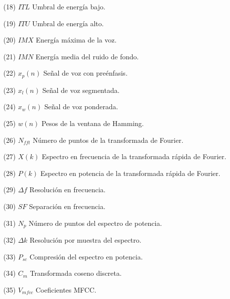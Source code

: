 \begin{enumerate}
\item[(18)] $ITL$ \hspace*{0.7cm} Umbral de energía bajo.
\item[(19)] $ITU$ \hspace*{0.7cm} Umbral de energía alto.
\item[(20)] $IMX$ \hspace*{0.55cm} Energía máxima de la voz.
\item[(21)] $IMN$ \hspace*{0.7cm} Energía media del ruido de fondo.
\item[(22)] $x_{p}(n)$ \hspace*{0.8cm} Señal de voz con preénfasis.
\item[(23)] $x_{l}(n)$ \hspace*{0.85cm} Señal de voz segmentada.
\item[(24)] $x_{w}(n)$ \hspace*{0.75cm} Señal de voz ponderada.
\item[(25)] $w(n)$ \hspace*{0.9cm} Pesos de la ventana de Hamming.
\item[(26)] $N_{fft}$ \hspace*{1.0cm} Número de puntos de la transformada de Fourier.
\item[(27)] $X(k)$ \hspace*{0.9cm} Espectro en frecuencia de la transformada rápida de Fourier.
\item[(28)] $P(k)$ \hspace*{0.95cm} Espectro en potencia de la transformada rápida de Fourier.
\item[(29)] $\Delta f$ \hspace*{1.2cm} Resolución en frecuencia.
\item[(30)] $SF$ \hspace*{1.2cm} Separación en frecuencia.
\item[(31)] $N_{p}$ \hspace*{1.3cm} Número de puntos del espectro de potencia.
\item[(32)] $\Delta k$ \hspace*{1.2cm} Resolución por muestra del espectro.
\item[(33)] $P_{sc}$ \hspace*{1.2cm} Compresión del espectro en potencia.
\item[(34)] $C_{m}$ \hspace*{1.2cm} Transformada coseno discreta.
\item[(35)] $V_{mfcc}$ \hspace*{0.8cm} Coeficientes MFCC.

\end{enumerate}
